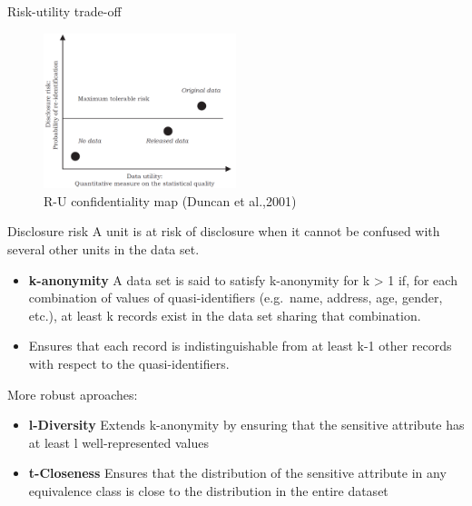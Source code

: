 \documentclass[
  ignorenonframetext,
  aspectratio=169,
]{beamer}
\begin{document}
\begin{frame}{Risk-utility trade-off}
\label{risk-utility-trade-off}
\begin{figure}[H]

{\centering \includegraphics[width=0.5\textwidth,height=\textheight]{gallery/R-U confidentiality map.png}

}

\caption{R-U confidentiality map (Duncan et al.,2001)}

\end{figure}%
\end{frame}

\begin{frame}{Disclosure risk}
\label{disclosure-risk}
A unit is at risk of disclosure when it cannot be confused with several
other units in the data set.

\begin{itemize}
\item
  \textbf{k-anonymity} A data set is said to satisfy k-anonymity for k
  \textgreater{} 1 if, for each combination of values of
  quasi-identifiers (e.g.~name, address, age, gender, etc.), at least k
  records exist in the data set sharing that combination.
\item
  Ensures that each record is indistinguishable from at least k-1 other
  records with respect to the quasi-identifiers.
\end{itemize}

More robust aproaches:

\begin{itemize}
\item
  \textbf{l-Diversity} Extends k-anonymity by ensuring that the
  sensitive attribute has at least l well-represented values
\item
  \textbf{t-Closeness} Ensures that the distribution of the sensitive
  attribute in any equivalence class is close to the distribution in the
  entire dataset
\end{itemize}
\end{frame}
\end{document}

